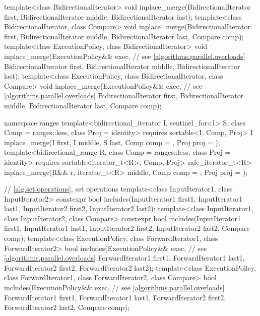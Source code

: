 \begin{codeblock}
{  template<class BidirectionalIterator>
    void inplace_merge(BidirectionalIterator first,
                       BidirectionalIterator middle,
                       BidirectionalIterator last);
  template<class BidirectionalIterator, class Compare>
    void inplace_merge(BidirectionalIterator first,
                       BidirectionalIterator middle,
                       BidirectionalIterator last, Compare comp);
  template<class ExecutionPolicy, class BidirectionalIterator>
    void inplace_merge(ExecutionPolicy&& exec,                  // see \ref{algorithms.parallel.overloads}
                       BidirectionalIterator first,
                       BidirectionalIterator middle,
                       BidirectionalIterator last);
  template<class ExecutionPolicy, class BidirectionalIterator, class Compare>
    void inplace_merge(ExecutionPolicy&& exec,                  // see \ref{algorithms.parallel.overloads}
                       BidirectionalIterator first,
                       BidirectionalIterator middle,
                       BidirectionalIterator last, Compare comp);

  namespace ranges {
    template<bidirectional_iterator I, sentinel_for<I> S, class Comp = ranges::less,
             class Proj = identity>
      requires sortable<I, Comp, Proj>
      I inplace_merge(I first, I middle, S last, Comp comp = {}, Proj proj = {});
    template<bidirectional_range R, class Comp = ranges::less, class Proj = identity>
      requires sortable<iterator_t<R>, Comp, Proj>
      safe_iterator_t<R>
        inplace_merge(R&& r, iterator_t<R> middle, Comp comp = {},
                      Proj proj = {});
  }

  // \ref{alg.set.operations}, set operations
  template<class InputIterator1, class InputIterator2>
    constexpr bool includes(InputIterator1 first1, InputIterator1 last1,
                            InputIterator2 first2, InputIterator2 last2);
  template<class InputIterator1, class InputIterator2, class Compare>
    constexpr bool includes(InputIterator1 first1, InputIterator1 last1,
                            InputIterator2 first2, InputIterator2 last2,
                            Compare comp);
  template<class ExecutionPolicy, class ForwardIterator1, class ForwardIterator2>
    bool includes(ExecutionPolicy&& exec,                       // see \ref{algorithms.parallel.overloads}
                  ForwardIterator1 first1, ForwardIterator1 last1,
                  ForwardIterator2 first2, ForwardIterator2 last2);
  template<class ExecutionPolicy, class ForwardIterator1, class ForwardIterator2,
           class Compare>
    bool includes(ExecutionPolicy&& exec,                       // see \ref{algorithms.parallel.overloads}
                  ForwardIterator1 first1, ForwardIterator1 last1,
                  ForwardIterator2 first2, ForwardIterator2 last2,
                  Compare comp);

}
\end{codeblock}
